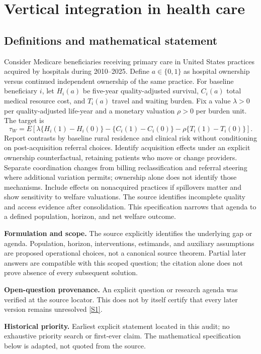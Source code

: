 \documentclass[11pt]{article}
\newcommand{\sref}[2]{\hyperlink{source:#1:#2}{[S#2]}}
\begin{document}
\section*{Vertical integration in health care}\label{30007723}
\subsection{Definitions and mathematical statement}
Consider Medicare beneficiaries receiving primary care in United States practices acquired by hospitals during 2010–2025. Define \(a\in\{0,1\}\) as hospital ownership versus continued independent ownership of the same practice. For baseline beneficiary \(i\), let \(H_i(a)\) be five-year quality-adjusted survival, \(C_i(a)\) total medical resource cost, and \(T_i(a)\) travel and waiting burden. Fix a value \(\lambda>0\) per quality-adjusted life-year and a monetary valuation \(\rho>0\) per burden unit. The target is
\[\tau_W=E[\lambda\{H_i(1)-H_i(0)\}-\{C_i(1)-C_i(0)\}-\rho\{T_i(1)-T_i(0)\}].\]
Report contrasts by baseline rural residence and clinical risk without conditioning on post-acquisition referral choices. Identify acquisition effects under an explicit ownership counterfactual, retaining patients who move or change providers. Separate coordination changes from billing reclassification and referral steering where additional variation permits; ownership alone does not identify those mechanisms. Include effects on nonacquired practices if spillovers matter and show sensitivity to welfare valuations. The source identifies incomplete quality and access evidence after consolidation. This specification narrows that agenda to a defined population, horizon, and net welfare outcome.

\par\textbf{Formulation and scope.} The source explicitly identifies the underlying gap or agenda. Population, horizon, interventions, estimands, and auxiliary assumptions are proposed operational choices, not a canonical source theorem. Partial later answers are compatible with this scoped question; the citation alone does not prove absence of every subsequent solution.

\par\textbf{Open-question provenance.} An explicit question or research agenda was verified at the source locator. This does not by itself certify that every later version remains unresolved \sref{30007723}{1}.

\par\textbf{Historical priority.} Earliest explicit statement located in this audit; no exhaustive priority search or first-ever claim. The mathematical specification below is adapted, not quoted from the source.
\end{document}
